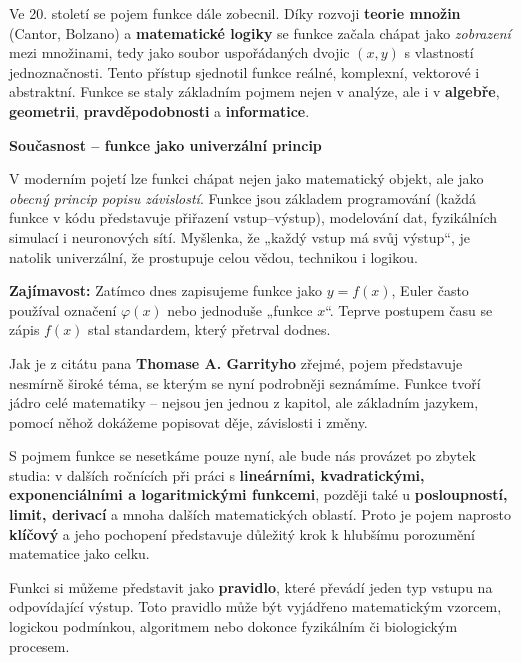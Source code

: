 \documentclass[12pt,a4paper]{article}
\begin{document}
\begin{historicalbox}
Ve 20. století se pojem funkce dále zobecnil.  
Díky rozvoji \textbf{teorie množin} (Cantor, Bolzano) a \textbf{matematické logiky} se funkce začala chápat jako \emph{zobrazení} mezi množinami, tedy jako soubor uspořádaných dvojic \((x, y)\) s vlastností jednoznačnosti.  
Tento přístup sjednotil funkce reálné, komplexní, vektorové i abstraktní.  
Funkce se staly základním pojmem nejen v analýze, ale i v \textbf{algebře}, \textbf{geometrii}, \textbf{pravděpodobnosti} a \textbf{informatice}.  

\medskip
\textbf{Současnost – funkce jako univerzální princip}

V moderním pojetí lze funkci chápat nejen jako matematický objekt, ale jako \emph{obecný princip popisu závislostí}.  
Funkce jsou základem programování (každá funkce v kódu představuje přiřazení vstup–výstup), modelování dat, fyzikálních simulací i neuronových sítí.  
Myšlenka, že „každý vstup má svůj výstup“, je natolik univerzální, že prostupuje celou vědou, technikou i logikou.
\end{historicalbox}



\begin{notebox}
\textbf{Zajímavost:}  
Zatímco dnes zapisujeme funkce jako \(y = f(x)\), Euler často používal označení \(\varphi(x)\) nebo jednoduše „funkce \(x\)“.  
Teprve postupem času se zápis \(f(x)\) stal standardem, který přetrval dodnes.
\end{notebox}


Jak je z citátu pana \textbf{Thomase A. Garrityho} zřejmé, pojem  představuje nesmírně široké téma, se kterým se nyní podrobněji seznámíme.  
Funkce tvoří jádro celé matematiky – nejsou jen jednou z kapitol, ale základním jazykem, pomocí něhož dokážeme popisovat děje, závislosti i změny.  

S pojmem funkce se nesetkáme pouze nyní, ale bude nás provázet po zbytek studia:  
v dalších ročnících při práci s \textbf{lineárními, kvadratickými, exponenciálními a logaritmickými funkcemi},  
později také u \textbf{posloupností, limit, derivací} a mnoha dalších matematických oblastí.  
Proto je pojem  naprosto \textbf{klíčový} a jeho pochopení představuje důležitý krok k hlubšímu porozumění matematice jako celku.

Funkci si můžeme představit jako \textbf{pravidlo}, které převádí jeden typ vstupu na odpovídající výstup.  
Toto pravidlo může být vyjádřeno matematickým vzorcem, logickou podmínkou, algoritmem nebo dokonce fyzikálním či biologickým procesem.
\end{document}
